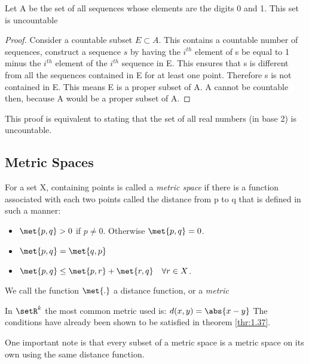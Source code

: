 \documentclass[12pt, letterpaper]{paper}
\begin{document}
\begin{theorem}
  \label{thr:2.14}
  Let A be the set of all sequences whose elements are the digits 0
  and 1.  This set is uncountable
\end{theorem}
\begin{proof}
  Consider a countable subset $E \subset A$. This contains a countable
  number of sequences, construct a sequence $s$ by having the $i^{th}$
  element of s be equal to 1 minus the $i^{th}$ element of the
  $i^{th}$ sequence in E. This ensures that s is different from all
  the sequences contained in E for at least one point. Therefore s is
  not contained in E.  This means E is a proper subset of A. A cannot
  be countable then, because A would be a proper subset of A.
\end{proof}
This proof is equivalent to stating that the set of all real numbers
(in base 2) is uncountable.


\subsection{Metric Spaces}
\label{sec:org632c7a9}
For a set X, containing points is called a \emph{metric space} if
there is a function associated with each two points called the
distance from p to q that is defined in such a manner:
\begin{itemize}
\item $\met{p,q} > 0$ if $p \neq 0$. Otherwise $\met{p,q} = 0$.
\item $\met{p,q} = \met{q,p}$
\item $\met{p,q} \leq \met{p,r} + \met{r,q} \quad \forall r \in X$.
\end{itemize}

We call the function $\met{.}$ a distance function, or a \emph{metric}

\vspace{ .33in }

In $\setR^{k}$ the most common metric used is: $d(x,y) = \abs{x-y}$
The conditions have already been shown to be satisfied in theorem
\ref{thr:1.37}.

One important note is that every subset of a metric space is a metric
space on its own using the same distance function.
\end{document}
